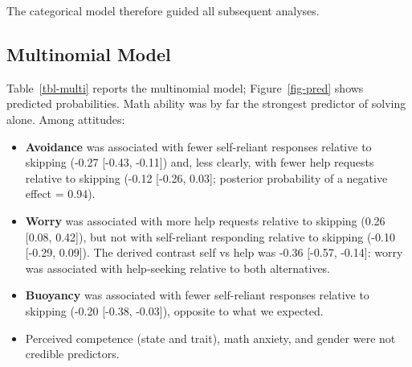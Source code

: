 \documentclass[
  man,
  floatsintext,
  longtable,
  nolmodern,
  notxfonts,
  notimes,
  colorlinks=true,linkcolor=blue,citecolor=blue,urlcolor=blue]{apa7}
\providecommand{\tightlist}{%
  \setlength{\itemsep}{0pt}\setlength{\parskip}{0pt}}
\begin{document}
The categorical model therefore guided all subsequent analyses.

\subsection{Multinomial Model}\label{multinomial-model-1}

Table~\ref{tbl-multi} reports the multinomial model;
Figure~\ref{fig-pred} shows predicted probabilities. Math ability was by
far the strongest predictor of solving alone. Among attitudes:

\begin{itemize}
\tightlist
\item
  \textbf{Avoidance} was associated with fewer self-reliant responses
  relative to skipping (-0.27 {[}-0.43, -0.11{]}) and, less clearly,
  with fewer help requests relative to skipping (-0.12 {[}-0.26,
  0.03{]}; posterior probability of a negative effect = 0.94).
\item
  \textbf{Worry} was associated with more help requests relative to
  skipping (0.26 {[}0.08, 0.42{]}), but not with self-reliant responding
  relative to skipping (-0.10 {[}-0.29, 0.09{]}). The derived contrast
  self vs help was -0.36 {[}-0.57, -0.14{]}: worry was associated with
  help-seeking relative to both alternatives.
\item
  \textbf{Buoyancy} was associated with fewer self-reliant responses
  relative to skipping (-0.20 {[}-0.38, -0.03{]}), opposite to what we
  expected.
\item
  Perceived competence (state and trait), math anxiety, and gender were
  not credible predictors.
\end{itemize}
\end{document}
